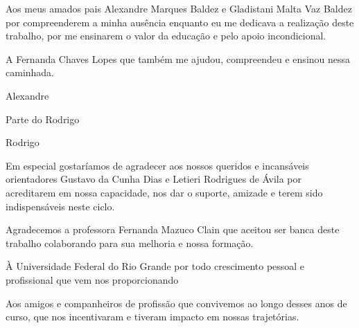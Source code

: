 Aos meus amados pais Alexandre Marques Baldez e Gladistani Malta Vaz Baldez
por compreenderem a minha ausência enquanto eu me dedicava a realização deste trabalho,
por me ensinarem o valor da educação e pelo apoio incondicional.

A Fernanda Chaves Lopes que também me ajudou, compreendeu e ensinou nessa caminhada.

\begin{flushright}Alexandre\end{flushright}

Parte do Rodrigo

\begin{flushright}Rodrigo\end{flushright}
    
Em especial gostaríamos de agradecer aos nossos queridos e incansáveis orientadores
Gustavo da Cunha Dias e Letieri Rodrigues de Ávila por acreditarem em nossa capacidade,
nos dar o suporte, amizade e terem sido indispensáveis neste ciclo.

Agradecemos a professora Fernanda Mazuco Clain que aceitou ser banca deste trabalho colaborando
para sua melhoria e nossa formação.

À Universidade Federal do Rio Grande por todo crescimento pessoal e profissional 
que vem nos proporcionando

Aos amigos e companheiros de profissão que convivemos ao longo desses anos de curso, que nos incentivaram
e tiveram impacto em nossas trajetórias.
